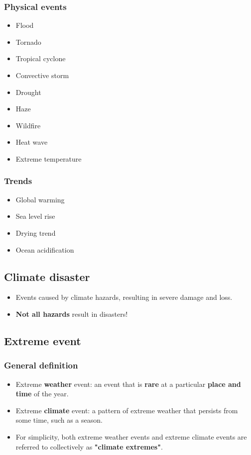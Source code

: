 \documentclass[11pt]{article}
\begin{document}
\subsubsection{Physical events}
\label{sec:orgf1ac4f5}
\begin{itemize}
\item Flood
\item Tornado
\item Tropical cyclone
\item Convective storm
\item Drought
\item Haze
\item Wildfire
\item Heat wave
\item Extreme temperature
\end{itemize}

\subsubsection{Trends}
\label{sec:org6da7ed7}
\begin{itemize}
\item Global warming
\item Sea level rise
\item Drying trend
\item Ocean acidification
\end{itemize}

\subsection{Climate disaster}
\label{sec:org4b47290}
\begin{itemize}
\item Events caused by climate hazards, resulting in severe damage and loss.
\item \textbf{Not all hazards} result in disasters!
\end{itemize}

\subsection{Extreme event}
\label{sec:org0421976}

\subsubsection{General definition}
\label{sec:orge01c8c0}
\begin{itemize}
\item Extreme \textbf{weather} event: an event that is \textbf{rare} at a particular \textbf{place and time} of the year.
\item Extreme \textbf{climate} event: a pattern of extreme weather that persists from some time, such as a season.
\item For simplicity, both extreme weather events and extreme climate events are referred to collectively as \textbf{"climate extremes"}.
\end{itemize}
\end{document}
